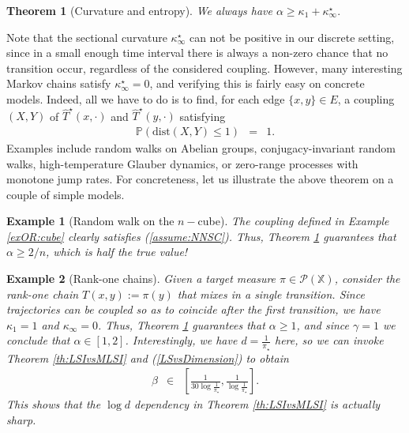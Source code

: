 \documentclass[12pt,final]{article}
\newtheorem{theorem}{Theorem}[section]
\newtheorem{example}{Example}[section]
\numberwithin{equation}{section}
\newcommand{\PP}{{\mathbb{P}}}
\newcommand{\dX}{\mathbb{X}}
\newcommand{\cP}{\mathcal{P}}
\newcommand{\dist}{\mathrm{dist}}
\begin{document}
\begin{theorem}[Curvature and entropy]\label{th:PT}We always have
$
\alpha \ge \kappa_1+\kappa_\infty^\star.
$
\end{theorem}
Note that the sectional curvature $\kappa_\infty^\star$ can not be positive in our discrete setting, since in a small enough time interval there is always a non-zero chance that no transition occur, regardless of the considered coupling. However, many interesting Markov chains satisfy $\kappa_\infty^\star=0$, and verifying this is fairly easy on concrete models. Indeed, all we have to do is to find, for each edge $\{x,y\}\in E$, a coupling $(X,Y)$ of $\widehat{T}^\star(x,\cdot)$ and $\widehat{T}^\star(y,\cdot)$ satisfying
\begin{eqnarray}
\label{assume:NNSC}
\PP\left(\dist(X,Y) \le  1\right) & = & 1.
\end{eqnarray}
Examples include random walks on Abelian groups, conjugacy-invariant random walks, high-temperature Glauber dynamics, or zero-range processes with monotone jump rates. For concreteness, let us illustrate the above theorem on  a couple of simple models.
\begin{example}[Random walk on the $n-$cube]The coupling defined in Example \ref{exOR:cube} clearly satisfies (\ref{assume:NNSC}). Thus, Theorem \ref{th:PT} guarantees that $\alpha\ge 2/n$, which is half the true value!
\end{example}
\begin{example}[Rank-one chains]\label{ex:rankone}Given a target measure $\pi\in\cP(\dX)$, consider the rank-one chain $T(x,y)  :=  \pi(y)$ that mixes in a single transition. Since trajectories can be coupled so as to coincide after the first transition, we have $\kappa_1=1$ and $\kappa_\infty=0$. Thus, Theorem \ref{th:PT} guarantees that $\alpha\ge 1$, and since $\gamma=1$ we conclude that $\alpha\in[1,2]$. Interestingly, we have $d=\frac{1}{\pi_\star}$ here, so we can invoke Theorem \ref{th:LSIvsMLSI} and (\ref{LSvsDimension})  to obtain
\begin{eqnarray*}
\beta & \in & \left[\frac{1}{30\log\frac{1}{\pi_\star}}, \frac{1}{\log\frac{1}{\pi_\star}}\right].
\end{eqnarray*}
This shows that the $\log d$ dependency in  Theorem \ref{th:LSIvsMLSI} is actually sharp. 
\end{example}
\end{document}
